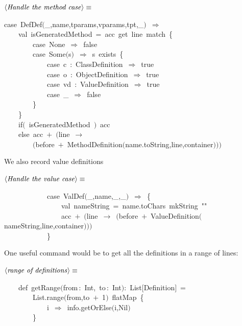 \documentclass[a4paper,12pt]{article}
\begin{document}
$\left<\mbox{\emph{Handle the method case}}\right>\equiv$
\begin{program}{\vem case}~DefDef$($\_,name,tparams,vparams,tpt,\_$)$~$\Rightarrow$
\\~~~~{\vem val}~isGeneratedMethod~=~acc~get~line~{\vem match}~{\small\{}
\\~~~~~~~~{\vem case}~None~$\Rightarrow$~{\vem false}
\\~~~~~~~~{\vem case}~Some$($s$)$~$\Rightarrow$~s~exists~{\small\{}
\\~~~~~~~~~~~~{\vem case}~c~{\rm :}~ClassDefinition~$\Rightarrow$~{\vem true}
\\~~~~~~~~~~~~{\vem case}~o~{\rm :}~ObjectDefinition~$\Rightarrow$~{\vem true}
\\~~~~~~~~~~~~{\vem case}~vd~{\rm :}~ValueDefinition~$\Rightarrow$~{\vem true}
\\~~~~~~~~~~~~{\vem case}~\_~$\Rightarrow$~{\vem false}
\\~~~~~~~~{\small\}}
\\~~~~{\small\}}
\\~~~~{\vem if}$($~isGeneratedMethod~$)$~acc
\\~~~~{\vem else}~acc~$+$~$($line~$\rightarrow$
\\~~~~~~~~$($before~$+$~MethodDefinition$($name.toString,line,container$)$$)$$)$
\\[0.5em]\end{program}
We also record value definitions

$\left<\mbox{\emph{Handle the value case}}\right>\equiv$
\begin{program}~~~~~~~~~~~~{\vem case}~ValDef$($\_,name,\_,\_$)$~$\Rightarrow$~{\small\{}
\\~~~~~~~~~~~~~~~~{\vem val}~nameString~=~name.toChars~mkString~""
\\~~~~~~~~~~~~~~~~acc~$+$~$($line~$\rightarrow$~$($before~$+$~ValueDefinition$($nameString,line,container$)$$)$$)$~
\\~~~~~~~~~~~~{\small\}}
\\[0.5em]\end{program}
 One useful
command would be to get all the definitions in a range of lines:

$\left<\mbox{\emph{range of definitions}}\right>\equiv$
\begin{program}~~~~{\vem def}~getRange$($from\,{\rm :}~Int,~to\,{\rm :}~Int$)${\rm :}~List$[$Definition$]$~=
\\~~~~~~~~List.range$($from,to~$+$~1$)$~flatMap~{\small\{}
\\~~~~~~~~~~~~i~$\Rightarrow$~info.getOrElse$($i,Nil$)$
\\~~~~~~~~{\small\}}
\\[0.5em]\end{program}
\end{document}
